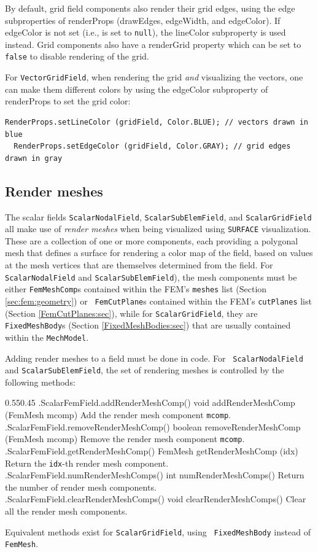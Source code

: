 By default, grid field components also render their grid edges, using
the edge subproperties of {\sf renderProps} ({\sf drawEdges}, {\sf
edgeWidth}, and {\sf edgeColor}). If {\sf edgeColor} is not set (i.e.,
is set to {\tt null}), the {\sf lineColor} subproperty is used instead.
Grid components also have a {\sf renderGrid} property which can be set
to {\tt false} to disable rendering of the grid.

For {\tt VectorGridField}, when rendering the grid {\it and}
visualizing the vectors, one can make them different colors by using
the {\sf edgeColor} subproperty of {\sf renderProps} to set the grid
color:
%
\begin{lstlisting}[]
  RenderProps.setLineColor (gridField, Color.BLUE); // vectors drawn in blue
  RenderProps.setEdgeColor (gridField, Color.GRAY); // grid edges drawn in gray
\end{lstlisting}
%

\subsection{Render meshes}
\label{renderingMeshes:sec}

The scalar fields {\tt ScalarNodalField}, {\tt ScalarSubElemField},
and {\tt ScalarGridField} all make use of {\it render meshes} when
being visualized using {\tt SURFACE} visualization. These are a
collection of one or more components, each providing a polygonal mesh
that defines a surface for rendering a color map of the field, based
on values at the mesh vertices that are themselves determined from the
field.  For {\tt ScalarNodalField} and {\tt ScalarSubElemField}), the
mesh components must be either {\tt FemMeshComp}s contained within the
FEM's {\tt meshes} list (Section \ref{sec:fem:geometry}) or {\tt
FemCutPlane}s contained within the FEM's {\tt cutPlanes} list
(Section \ref{FemCutPlanes:sec}), while for {\tt ScalarGridField},
they are {\tt FixedMeshBody}s (Section \ref{FixedMeshBodies:sec}) that
are usually contained within the {\tt MechModel}.

Adding render meshes to a field must be done in code. For {\tt
ScalarNodalField} and {\tt ScalarSubElemField}, the set of rendering
meshes is controlled by the following methods:
%
\begin{methodtable}{0.55}{0.45}
\midline
%
\methodentry
{\fields.ScalarFemField.addRenderMeshComp()}
{void addRenderMeshComp (FemMesh mcomp)}%
{Add the render mesh component {\tt mcomp}.}%
%
\methodentry
{\fields.ScalarFemField.removeRenderMeshComp()}%
{boolean removeRenderMeshComp (FemMesh mcomp)}%
{Remove the render mesh component {\tt mcomp}.}%
%
\methodentry
{\fields.ScalarFemField.getRenderMeshComp()}%
{FemMesh getRenderMeshComp (idx)}%
{Return the {\tt idx}-th render mesh component.}%
%
\methodentry
{\fields.ScalarFemField.numRenderMeshComps()}%
{int numRenderMeshComps()}%
{Return the number of render mesh components.}%
%
\methodentry
{\fields.ScalarFemField.clearRenderMeshComps()}%
{void clearRenderMeshComps()}%
{Clear all the render mesh components.}%
%
\midline
\end{methodtable}
%
Equivalent methods exist for {\tt ScalarGridField}, using {\tt
FixedMeshBody} instead of {\tt FemMesh}.

